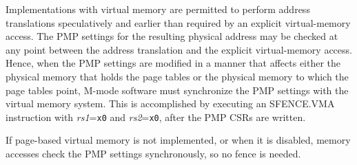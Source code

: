 Implementations with virtual memory are permitted to perform address
translations speculatively and earlier than required by an explicit
virtual-memory access.  The PMP settings for the resulting physical address
may be checked at any point between the address translation and the explicit
virtual-memory access.  Hence, when the PMP settings are modified in a manner
that affects either the physical memory that holds the page tables or the
physical memory to which the page tables point, M-mode software must
synchronize the PMP settings with the virtual memory system.  This is
accomplished by executing an SFENCE.VMA instruction with {\em rs1}={\tt x0}
and {\em rs2}={\tt x0}, after the PMP CSRs are written.

If page-based virtual memory is not implemented, or when it is disabled,
memory accesses check the PMP settings synchronously, so no fence is needed.
